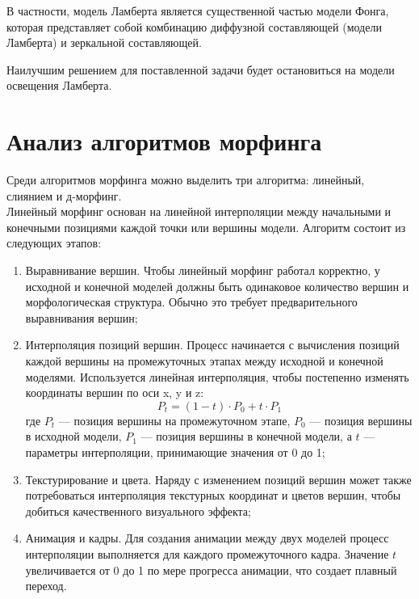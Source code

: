 В частности, модель Ламберта является существенной частью модели Фонга, которая представляет собой комбинацию диффузной составляющей (модели Ламберта) и зеркальной составляющей. \cite{Zadorozhnyi}

\leavevmode

Наилучшим решением для поставленной задачи будет остановиться на модели освещения Ламберта.

\newpage

\section{Анализ алгоритмов морфинга}

Среди алгоритмов морфинга можно выделить три алгоритма: линейный, слиянием и д-морфинг.\\

Линейный морфинг основан на линейной интерполяции между начальными и конечными позициями каждой точки или вершины модели. Алгоритм состоит из следующих этапов:

\begin{enumerate}
	\item Выравнивание вершин. Чтобы линейный морфинг работал корректно, у исходной и конечной моделей должны быть одинаковое количество вершин и морфологическая структура. Обычно это требует предварительного выравнивания вершин;
	\item Интерполяция позиций вершин. Процесс начинается с вычисления позиций каждой вершины на промежуточных этапах между исходной и конечной моделями. Используется линейная интерполяция, чтобы постепенно изменять координаты вершин по оси x, y и z:
	\begin{equation}
		P_{t} = (1 - t) \cdot P_{0} + t \cdot P_{1}
	\end{equation}
	где \( P_{t} \) — позиция вершины на промежуточном этапе, \( P_{0} \) — позиция вершины в исходной модели, \( P_{1} \) — позиция вершины в конечной модели, а \( t \) — параметры интерполяции, принимающие значения от 0 до 1;
	\item Текстурирование и цвета. Наряду с изменением позиций вершин может также потребоваться интерполяция текстурных координат и цветов вершин, чтобы добиться качественного визуального эффекта;
	\item Анимация и кадры. Для создания анимации между двух моделей процесс интерполяции выполняется для каждого промежуточного кадра. Значение \( t \) увеличивается от 0 до 1 по мере прогресса анимации, что создает плавный переход.
\end{enumerate}

